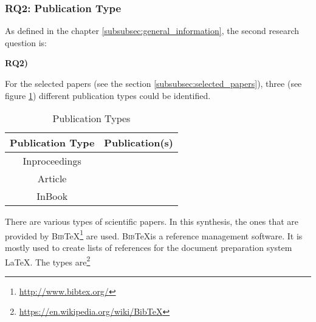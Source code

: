 \subsubsection{RQ2: Publication Type }
\label{subsubsec:rQ2_publication_type}
As defined in the chapter \ref{subsubsec:general_information}, the second research question is:
\begin{displayquote}
\textbf{RQ2) }
\end{displayquote}
For the selected papers (see the section \ref{subsubsec:selected_papers}), three (see figure \ref{tab:rq2_publication_type}) different publication types could be identified.
\begin{longtable}{ |c|c| }
	\caption{Publication Types} \label{tab:rq2_publication_type}  \\
	\hline
 	Publication Type & Publication(s) \\ [0.5ex] 
 	\hline\hline
 		Inproceedings  & \cite{2016_Azaria,2015_Dennis,2017_Gipp,2016_Jacynycz,2016_Kianmajd,2017_Naerland,2017_Ouaddah, 2016_Schaub,2017_Tackmann,2016_Sharples,2016_Tian,2016_Yasin,2015_Zyskind} \\ 
	 \hline
	 Article & \cite{2018_Alessandra,2016_Bahga,2017_Coyne,2017_Liu,2018_Lucena,2017_Madhwal,2016_Yue} \\  
	 \hline
	 InBook & \cite{2017_Jaag} \\  
	 \hline
\end{longtable}
There are various types of scientific papers. In this synthesis, the ones that are provided by \textsc{Bib}\TeX \footnote{\url{http://www.bibtex.org/}} are used. \textsc{Bib}\TeX is a reference management software. It is mostly used to create lists of references for the document preparation system \LaTeX. The types are\footnote{\url{https://en.wikipedia.org/wiki/BibTeX}}
